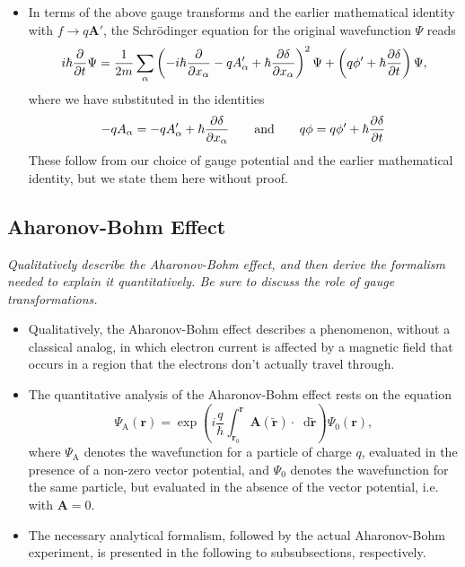 \documentclass[11pt, a4paper]{article}
\newcommand{\diff}{\mathop{}\!\mathrm{d}} %
\renewcommand{\grad}{\nabla}
\newcommand{\eqtext}[1]{\qquad \text{#1} \qquad}
\newcommand{\Schro}{Schr\"{o}dinger\xspace}
\renewcommand{\vec}[1]{\bm{#1}}  %
\renewcommand{\t}[1]{\tilde{#1}}
\renewcommand{\r}{\vec{r}}  %
\newcommand{\A}{\vec{A}}  %
\renewcommand{\P}{\Psi}  %
\begin{document}
\begin{itemize}
	Finally, to make the next steps more clear, we use $ \Psi'(\r, t) = e^{i \delta(\r, t)}\Psi(\r, t) $ to write the transformed \Schro equation in the form
    \begin{equation*}
        i \hbar \pdv{t} e^{i \delta(\r, t)}\Psi(\r, t) = \frac{(- i \hbar \grad - q \A')^{2}}{2m}e^{i\delta(\r, t)}\P(\r, t) + i \phi' e^{i\delta(\r, t)}\Psi(\r, t).
    \end{equation*}

	
	\item In terms of the above gauge transforms and the earlier mathematical identity with $ f \to q \A' $, the \Schro equation for the original wavefunction $ \P $ reads
	\begin{equation*}
		i\hbar \pdv{t}\P = \frac{1}{2m}\sum_{\alpha}\left(-i\hbar \pdv{x_{\alpha}} - q A'_{\alpha} + \hbar \pdv{\delta}{x_{\alpha}}\right)^{2} \P + \left(q\phi' + \hbar \pdv{\delta}{t}\right)\P,
	\end{equation*}
	where we have substituted in the identities
	\begin{equation*}
		-qA_{\alpha} = -qA'_{\alpha} + \hbar \pdv{\delta}{x_{\alpha}} \eqtext{and} q\phi = q\phi' + \hbar \pdv{\delta}{t} 
	\end{equation*}
	These follow from our choice of gauge potential and the earlier mathematical identity, but we state them here without proof.
	
\end{itemize}


\subsection{Aharonov-Bohm Effect}
\textit{Qualitatively describe the Aharonov-Bohm effect, and then derive the formalism needed to explain it quantitatively. Be sure to discuss the role of gauge transformations.}

\begin{itemize}
    \item Qualitatively, the Aharonov-Bohm effect describes a phenomenon, without a classical analog, in which electron current is affected by a magnetic field that occurs in a region that the electrons don't actually travel through.

	\item The quantitative analysis of the Aharonov-Bohm effect rests on the equation
	\begin{equation*}
		\P_{\text{A}}(\r) = \exp\left(i\frac{q}{\hbar} \int_{\r_{0}}^{\r}\A(\t{\r})\cdot \diff\t{\r}\right) \P_{0}(\r),
	\end{equation*}
    where $ \P_{\text{A}} $ denotes the wavefunction for a particle of charge $ q $, evaluated in the presence of a non-zero vector potential, and $ \P_{0} $ denotes the wavefunction for the same particle, but evaluated in the absence of the vector potential, i.e. with $ \A = 0 $.

    \item The necessary analytical formalism, followed by the actual Aharonov-Bohm experiment, is presented in the following to subsubsections, respectively.

\end{itemize}
\end{document}

